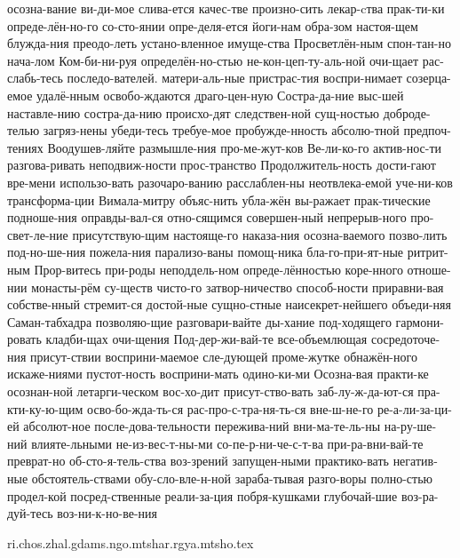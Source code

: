 \documentclass[8pt,twoside]{article}
\begin{document}
{             осозна-вание ви-ди-мое слива-ется качес-тве произно-сить лекар-cтва
             прак-ти-ки опреде-лён-но-го со-сто-янии опре-деля-ется йоги-нам
             обра-зом настоя-щем блужда-ния преодо-леть устано-вленное имуще-ства
             Просветлён-ным спон-тан-но нача-лом Ком-би-ни-руя определён-но-стью
             не-кон-цеп-ту-аль-ной очи-щает рас-слабь-тесь последо-вателей.
             матери-аль-ные пристрас-тия воспри-нимает созерца-емое удалё-нным
             освобо-ждаются драго-цен-ную Состра-да-ние выс-шей наставле-нию
             состра-да-нию происхо-дят следствен-ной сущ-ностью доброде-телью
             загряз-нены убеди-тесь требуе-мое пробужде-нность абсолю-тной
             предпоч-тениях Воодушев-ляйте размышле-ния про-ме-жут-ков
             Ве-ли-ко-го актив-нос-ти разгова-ривать неподвиж-ности прос-транство
             Продолжитель-ность дости-гают вре-мени использо-вать разочаро-ванию
             расслаблен-ны неотвлека-емой уче-ни-ков трансформа-ции
             Вимала-митру объяс-нить убла-жён вы-ражает прак-тические подноше-ния
             оправды-вал-ся отно-сящимся совершен-ный непрерыв-ного
             про-свет-ле-ние присутствую-щим настояще-го наказа-ния осозна-ваемого
             позво-лить под-но-ше-ния пожела-ния парализо-ваны помощ-ника
             бла-го-при-ят-ные ритрит-ным Прор-витесь при-роды неподдель-ном
             опреде-лённостью коре-нного отноше-нии монасты-рём  су-ществ чисто-го
             затвор-ничество способ-ности приравни-вая собстве-нный стремит-ся
             достой-ные сущно-стные наисекрет-нейшего объеди-няя
             Саман-табхадра позволяю-щие разговари-вайте ды-хание
             под-ходящего гармони-ровать кладби-щах очи-щения
             Под-дер-жи-вай-те все-объемлющая сосредоточе-ния присут-ствии
             восприни-маемое сле-дующей проме-жутке обнажён-ного
             искаже-ниями пустот-ность восприни-мать одино-ки-ми
             Осозна-вая практи-ке осознан-ной летарги-ческом вос-хо-дит
             присут-ство-вать заб-лу-ж-да-ют-ся пра-кти-ку-ю-щим
             осво-бо-жда-ть-ся рас-про-с-тра-ня-ть-ся  вне-ш-не-го
             ре-а-ли-за-ци-ей абсолют-ное после-дова-тельности пережива-ний
             вни-ма-те-ль-ны на-ру-ше-ний влияте-льными
             не-из-вес-т-ны-ми со-пе-р-ни-че-с-т-ва
             при-ра-вни-вай-те преврат-но  об-сто-я-тель-ства воз-зрений
             запущен-ными  практико-вать негатив-ные обстоятель-ствами
             обу-сло-вле-н-ной зараба-тывая разго-воры полно-стью
             продел-кой посред-ственные  реали-за-ция побря-кушками
             глубочай-шие воз-ра-дуй-тесь воз-ни-к-но-ве-ния
             }

%
{ri.chos.zhal.gdams.ngo.mtshar.rgya.mtsho.tex}



\end{document}
